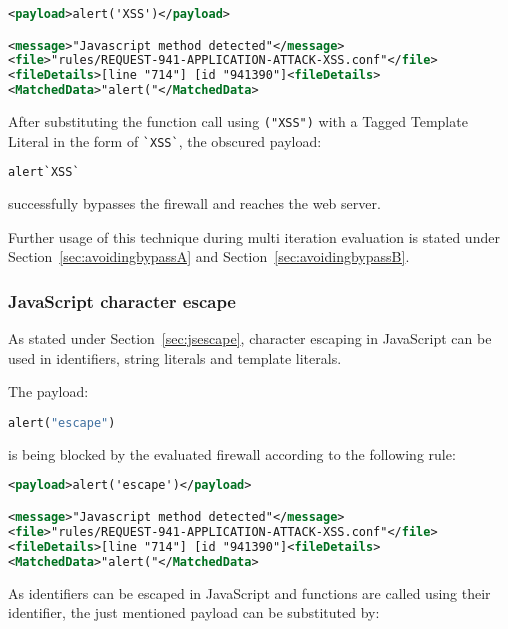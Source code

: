 \begin{lstlisting}[style=ruleStyle, language=XML, caption=alert('XSS') blocked, label={lst:alertXSSblocked}]
<payload>alert('XSS')</payload>

<message>"Javascript method detected"</message>
<file>"rules/REQUEST-941-APPLICATION-ATTACK-XSS.conf"</file>
<fileDetails>[line "714"] [id "941390"]<fileDetails>
<MatchedData>"alert("</MatchedData>
\end{lstlisting}

After substituting the function call using \verb|("XSS")| with a Tagged Template Literal in the form of \verb|`XSS`|, the obscured payload:

\begin{lstlisting}[style=basicStyle, language=Python, caption=alert`XSS` bypass, label=lst:alertXSSbypass]
alert`XSS`
\end{lstlisting}

successfully bypasses the firewall and reaches the web server.

Further usage of this technique during multi iteration evaluation is stated under Section~\ref{sec:avoidingbypassA} and Section~\ref{sec:avoidingbypassB}.

\subsubsection{JavaScript character escape}
\label{sec:jsescapesingleiter}
As stated under Section~\ref{sec:jsescape}, character escaping in JavaScript can be used in identifiers, string literals and template literals.

The payload:

\begin{lstlisting}[style=basicStyle, language=Python]
alert("escape")
\end{lstlisting}

is being blocked by the evaluated firewall according to the following rule:

\begin{lstlisting}[style=ruleStyle, language=XML, caption=alert('escape') blocked]
<payload>alert('escape')</payload>

<message>"Javascript method detected"</message>
<file>"rules/REQUEST-941-APPLICATION-ATTACK-XSS.conf"</file>
<fileDetails>[line "714"] [id "941390"]<fileDetails>
<MatchedData>"alert("</MatchedData>
\end{lstlisting}

As identifiers can be escaped in JavaScript and functions are called using their identifier, the just mentioned payload can be substituted by:

